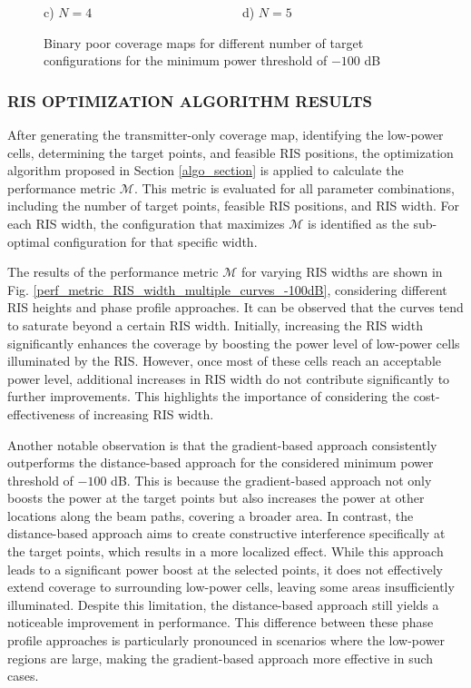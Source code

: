 \documentclass{IEEEoj}
\begin{document}
\begin{figure}
	c) $N = 4$ \ \ \ \ \ \ \ \ \ \ \ \ \ \ \ \ \ \ \ \ \ \ \ d) $N = 5$
	\caption{Binary poor coverage maps for different number of target configurations for the minimum power threshold of $-100$ dB}
	\label{binary_maps}
\end{figure}

\subsubsection{RIS OPTIMIZATION ALGORITHM RESULTS}
After generating the transmitter-only coverage map, identifying the low-power cells, determining the target points, and feasible RIS positions, the optimization algorithm proposed in Section \ref{algo_section} is applied to calculate the performance metric $\mathcal{M}$. This metric is evaluated for all parameter combinations, including the number of target points, feasible RIS positions, and RIS width. For each RIS width, the configuration that maximizes $\mathcal{M}$ is identified as the sub-optimal configuration for that specific width.

The results of the performance metric $\mathcal{M}$ for varying RIS widths are shown in Fig. \ref{perf_metric_RIS_width_multiple_curves_-100dB}, considering different RIS heights and phase profile approaches. It can be observed that the curves tend to saturate beyond a certain RIS width. Initially, increasing the RIS width significantly enhances the coverage by boosting the power level of low-power cells illuminated by the RIS. However, once most of these cells reach an acceptable power level, additional increases in RIS width do not contribute significantly to further improvements. This highlights the importance of considering the cost-effectiveness of increasing RIS width.

Another notable observation is that the gradient-based approach consistently outperforms the distance-based approach for the considered minimum power threshold of $-100$ dB. This is because the gradient-based approach not only boosts the power at the target points but also increases the power at other locations along the beam paths, covering a broader area. In contrast, the distance-based approach aims to create constructive interference specifically at the target points, which results in a more localized effect. While this approach leads to a significant power boost at the selected points, it does not effectively extend coverage to surrounding low-power cells, leaving some areas insufficiently illuminated. Despite this limitation, the distance-based approach still yields a noticeable improvement in performance. This difference between these phase profile approaches is particularly pronounced in scenarios where the low-power regions are large, making the gradient-based approach more effective in such cases.
\end{document}
